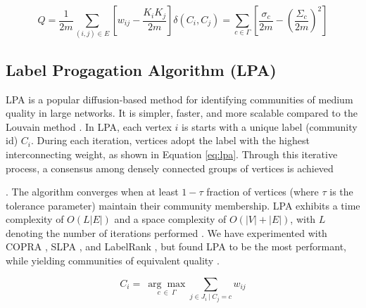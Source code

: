 \begin{equation}
\label{eq:modularity}
  Q
  = \frac{1}{2m} \sum_{(i, j) \in E} \left[w_{ij} - \frac{K_i K_j}{2m}\right] \delta(C_i, C_j)
  = \sum_{c \in \Gamma} \left[\frac{\sigma_c}{2m} - \left(\frac{\Sigma_c}{2m}\right)^2\right]
\end{equation}





\subsection{Label Progagation Algorithm (LPA)}
\label{sec:about-rak}

LPA \cite{com-raghavan07} is a popular diffusion-based method for identifying communities of medium quality in large networks. It is simpler, faster, and more scalable compared to the Louvain method \cite{com-blondel08}. In LPA, each vertex $i$ is starts with a unique label (community id) $C_i$. During each iteration, vertices adopt the label with the highest interconnecting weight, as shown in Equation \ref{eq:lpa}. Through this iterative process, a consensus among densely connected groups of vertices is achieved. The algorithm converges when at least $1-\tau$ fraction of vertices (where $\tau$ is the tolerance parameter) maintain their community membership. LPA exhibits a time complexity of $O(L |E|)$ and a space complexity of $O(|V| + |E|)$, with $L$ denoting the number of iterations performed \cite{com-raghavan07}. We have experimented with COPRA \cite{com-gregory10}, SLPA \cite{com-xie11}, and LabelRank \cite{com-xie13}, but found LPA to be the most performant, while yielding communities of equivalent quality \cite{sahu2023selecting}.

\begin{equation}
\label{eq:lpa}
  C_i =\ \underset{c\ \in \ \Gamma}{\arg\max} { \sum_{j \in J_i\ |\ C_j = c} w_{ij} }
\end{equation}
